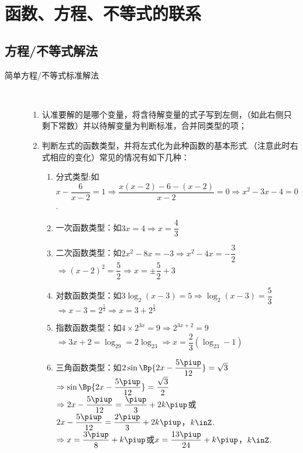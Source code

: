 \section{函数、方程、不等式的联系}
  \subsection{方程/不等式解法}
    \begin{description}
      \item[简单方程/不等式标准解法]\hspace{0.5em}\\\vspace{-2.5em}\begin{enumerate}[label=\arabic*)]
        \item 认准要解的是哪个变量，将含待解变量的式子写到左侧，（如此右侧只剩下常数）并以待解变量为判断标准，合并同类型的项；
        \item 判断左式的函数类型，并将左式化为此种函数的基本形式.（注意此时右式相应的变化）常见的情况有如下几种：
              \begin{enumerate}[label=\circled{\arabic*}]
                \item 分式类型:如$x-\dfrac6{x-2}=1 \Rightarrow \dfrac{x(x-2)-6-(x-2)}{x-2}=0 \Rightarrow x^2-3x-4=0$.
                \item 一次函数类型：如$3x=4 \Rightarrow x=\dfrac43$
                \item 二次函数类型：如$2x^2-8x=-3 \Rightarrow x^2-4x=-\dfrac32$
                  $\Rightarrow(x-2)^2=\dfrac52 \Rightarrow x=\pm\dfrac52+3$
                \item 对数函数类型：如$3\log_2(x-3)=5 \Rightarrow \log_2(x-3)=\dfrac53$
                  $\Rightarrow x-3=2^{\frac53} \Rightarrow x=3+2^{\frac53}$
                \item 指数函数类型：如$4\times 2^{3x}=9 \Rightarrow 2^{3x+2}=9$
                  $\Rightarrow 3x+2=\log_29=2\log_23 \Rightarrow x=\dfrac23(\log_23-1)$
                \item 三角函数类型：如$2\sin\Bp{2x-\dfrac{5\piup}{12}}=\sqrt3$
                  $\Rightarrow \sin\Bp{2x-\dfrac{5\piup}{12}}=\dfrac{\sqrt3}2$
                  $\Rightarrow 2x-\dfrac{5\piup}{12}=\dfrac{\piup}3+2k\piup$或
                  $2x-\dfrac{5\piup}{12}=\dfrac{2\piup}3+2k\piup$，$k\inZ$.
                  $\Rightarrow x=\dfrac{3\piup}8+k\piup$或$x=\dfrac{13\piup}{24}+k\piup$，$k\inZ$.
              \end{enumerate}
      \end{enumerate}
    \end{description}
